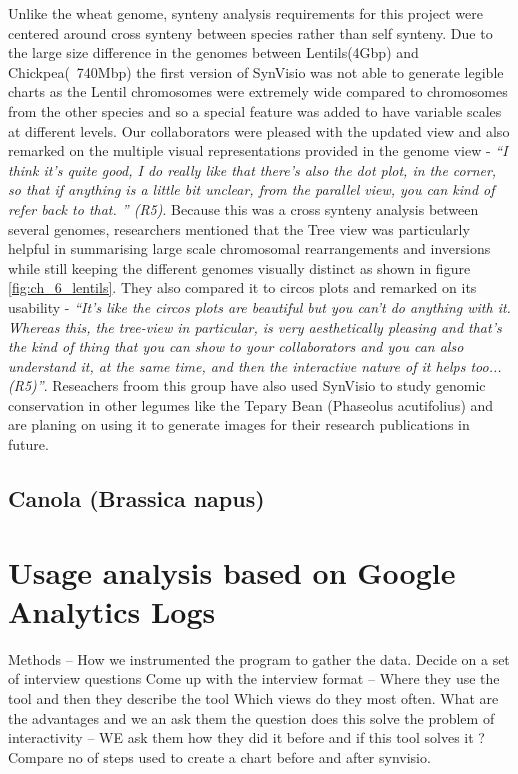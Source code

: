 Unlike the wheat genome, synteny analysis requirements for this project were centered around cross synteny between species rather than self synteny. Due to the large size difference in the genomes between Lentils(4Gbp) and Chickpea(~740Mbp) the first version of SynVisio was not able to generate legible charts as the Lentil chromosomes were extremely wide compared to chromosomes from the other species and so a special feature was added to have variable scales at different levels. Our collaborators were pleased with the updated view and also remarked on the multiple visual representations provided in the genome view - \textit{``I think it's quite good, I do really like that there's also the dot plot, in the corner, so that if anything is a little bit unclear, from the parallel view, you can kind of refer back to that.
'' (R5)}. Because this was a cross synteny analysis between several genomes, researchers mentioned that the Tree view was particularly helpful in summarising large scale chromosomal rearrangements and inversions while still keeping the different genomes visually distinct as shown in figure \ref{fig:ch_6_lentils}. They also compared it to circos plots and remarked on its usability - \textit{``It's like the circos plots are beautiful but you can't do anything with it. Whereas this, the tree-view in particular, is very aesthetically pleasing and that's the kind of thing that you can show to your collaborators and you can also understand it, at the same time, and then the interactive nature of it helps too...
(R5)''}. Reseachers froom this group have also used SynVisio to study genomic conservation in other legumes like the Tepary Bean (Phaseolus acutifolius) and are planing on using it to generate images for their research publications in future.

\subsection{Canola (Brassica napus)}




\section{Usage analysis based on Google Analytics Logs}


 
Methods – How we instrumented the program to gather the data.
Decide on a set of interview questions 
Come up with the interview format – Where they use the tool and then they describe the tool
Which views do they most often.
What are the advantages and we an ask them the question does this solve the problem of interactivity – WE ask them how they did it before and if this tool solves it ?
Compare no of steps used to create a chart before and after synvisio.

